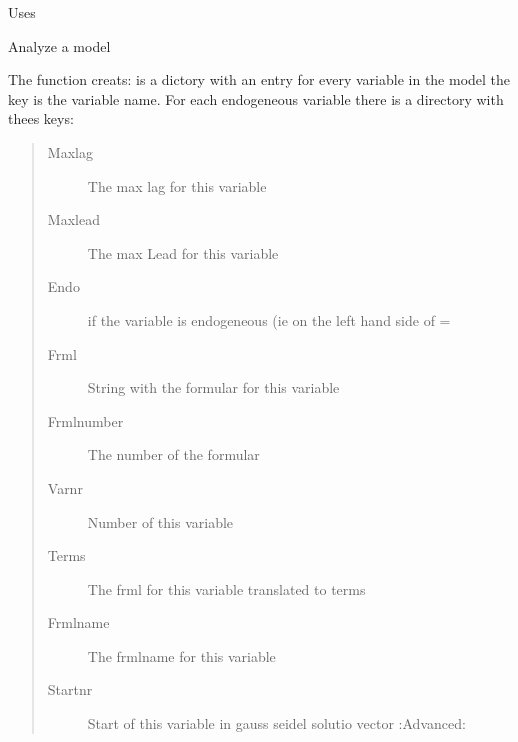 \documentclass[letterpaper,10pt,english]{sphinxmanual}
\begin{document}
\begin{fulllineitems}
\begin{fulllineitems}
\sphinxAtStartPar
Uses {\hyperref[\detokenize{index:modelmanipulation.find_hist_model}]{}}

\end{fulllineitems}


\begin{fulllineitems}
\label{\detokenize{index:modelclass.BaseModel.analyzemodelnew}}
\pysigstartsignatures
{}
\pysigstopsignatures
\sphinxAtStartPar
Analyze a model

\sphinxAtStartPar
The function creats: is a dictory with an entry for every variable in the model
the key is the variable name.
For each endogeneous variable there is a directory with thees keys:
\begin{quote}\begin{description}
\item[{Maxlag}] \leavevmode
\sphinxAtStartPar
The max lag for this variable

\item[{Maxlead}] \leavevmode
\sphinxAtStartPar
The max Lead for this variable

\item[{Endo}] \leavevmode
{} if the variable is endogeneous (ie on the left hand side of =

\item[{Frml}] \leavevmode
\sphinxAtStartPar
String with the formular for this variable

\item[{Frmlnumber}] \leavevmode
\sphinxAtStartPar
The number of the formular

\item[{Varnr}] \leavevmode
\sphinxAtStartPar
Number of this variable

\item[{Terms}] \leavevmode
\sphinxAtStartPar
The frml for this variable translated to terms

\item[{Frmlname}] \leavevmode
\sphinxAtStartPar
The frmlname for this variable

\item[{Startnr}] \leavevmode
\sphinxAtStartPar
Start of this variable in gauss seidel solutio vector :Advanced:


\end{description}
\end{quote}
\end{fulllineitems}
\end{fulllineitems}
\end{document}
